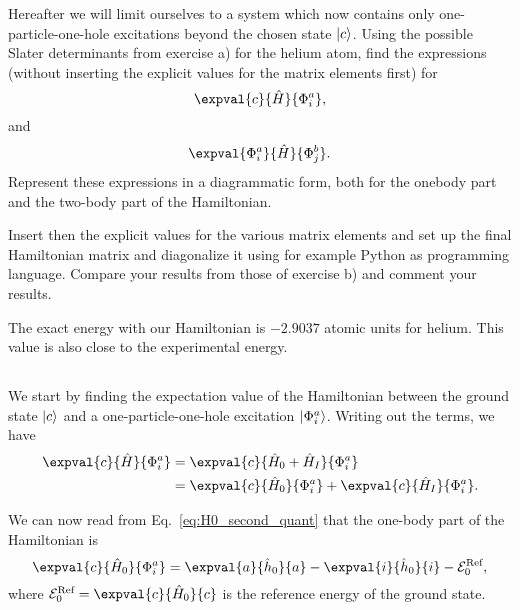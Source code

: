 Hereafter we will limit ourselves to a system which now contains only one-particle-one-hole excitations beyond the chosen state $\lvert c\rangle$.
Using the possible Slater determinants from exercise a) for the helium atom, find the expressions (without inserting the explicit values for the matrix elements first) for %
\begin{equation*}
    \expval{c}{\hat{H}}{\Phi_i^a},
\end{equation*}
and
\begin{equation*}
    \expval{\Phi_i^a}{\hat{H}}{\Phi_j^b}.
\end{equation*}
Represent these expressions in a diagrammatic form, both for the onebody part and the two-body part of the Hamiltonian.

Insert then the explicit values for the various matrix elements and set up the final Hamiltonian matrix and diagonalize it using for example Python as programming language.
Compare your results from those of exercise b) and comment your results. %

The exact energy with our Hamiltonian is $-2.9037$ atomic units for helium.
This value is also close to the experimental energy.

\subsection{}
We start by finding the expectation value of the Hamiltonian between the ground state $\lvert c\rangle$ and a one-particle-one-hole excitation $\lvert\Phi_i^a\rangle$.
Writing out the terms, we have
\begin{align*}
    \expval{c}{\hat{H}}{\Phi_i^a} &= \expval{c}{\hat{H}_0 + \hat{H}_I}{\Phi_i^a} \\
    &= \expval{c}{\hat{H}_0}{\Phi_i^a} + \expval{c}{\hat{H}_I}{\Phi_i^a}. \\
\end{align*}

We can now read from Eq.~\eqref{eq:H0_second_quant} that the one-body part of the Hamiltonian is
\begin{equation*}
    \expval{c}{\hat{H}_0}{\Phi_i^a} = \expval{a}{\hat{h}_0}{a} - \expval{i}{\hat{h}_0}{i} - \mathcal{E}_0^{\text{Ref}},
\end{equation*}
where $\mathcal{E}_0^{\text{Ref}} = \expval{c}{\hat{H}_0}{c}$ is the reference energy of the ground state.

